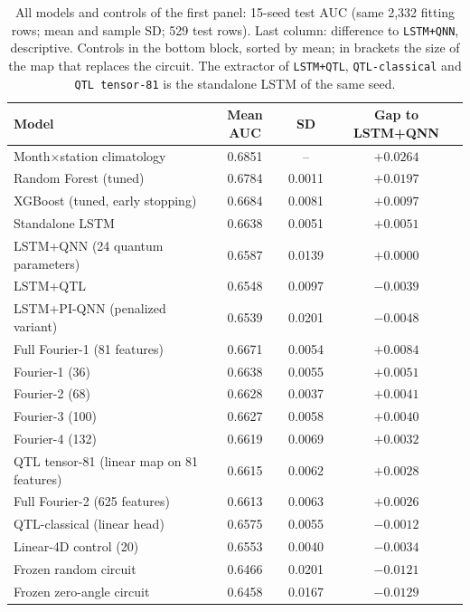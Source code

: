 \documentclass[11pt,a4paper]{article}
\begin{document}
\begin{table}[htbp]
\centering
\caption{All models and controls of the first panel: 15-seed test AUC (same 2{,}332 fitting rows; mean and sample SD; 529 test rows). Last column: difference to \texttt{LSTM+QNN}, descriptive. Controls in the bottom block, sorted by mean; in brackets the size of the map that replaces the circuit. The extractor of \texttt{LSTM+QTL}, \texttt{QTL-classical} and \texttt{QTL tensor-81} is the standalone LSTM of the same seed.}
\label{tab:case_all}
{\small
\begin{tabular}{lccc}
\toprule
\textbf{Model} & \textbf{Mean AUC} & \textbf{SD} & \textbf{Gap to LSTM+QNN} \\
\midrule
Month$\times$station climatology & 0.6851 & -- & $+0.0264$ \\
\midrule
Random Forest (tuned) & 0.6784 & 0.0011 & $+0.0197$ \\
XGBoost (tuned, early stopping) & 0.6684 & 0.0081 & $+0.0097$ \\
Standalone LSTM & 0.6638 & 0.0051 & $+0.0051$ \\
LSTM+QNN (24 quantum parameters) & 0.6587 & 0.0139 & $+0.0000$ \\
LSTM+QTL & 0.6548 & 0.0097 & $-0.0039$ \\
LSTM+PI-QNN (penalized variant) & 0.6539 & 0.0201 & $-0.0048$ \\
\midrule
Full Fourier-1 (81 features) & 0.6671 & 0.0054 & $+0.0084$ \\
Fourier-1 (36) & 0.6638 & 0.0055 & $+0.0051$ \\
Fourier-2 (68) & 0.6628 & 0.0037 & $+0.0041$ \\
Fourier-3 (100) & 0.6627 & 0.0058 & $+0.0040$ \\
Fourier-4 (132) & 0.6619 & 0.0069 & $+0.0032$ \\
QTL tensor-81 (linear map on 81 features) & 0.6615 & 0.0062 & $+0.0028$ \\
Full Fourier-2 (625 features) & 0.6613 & 0.0063 & $+0.0026$ \\
QTL-classical (linear head) & 0.6575 & 0.0055 & $-0.0012$ \\
Linear-4D control (20) & 0.6553 & 0.0040 & $-0.0034$ \\
Frozen random circuit & 0.6466 & 0.0201 & $-0.0121$ \\
Frozen zero-angle circuit & 0.6458 & 0.0167 & $-0.0129$ \\
\bottomrule
\end{tabular}%
}
\end{table}
\end{document}
